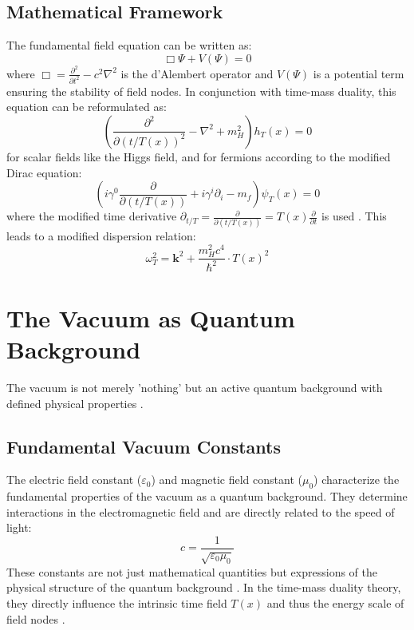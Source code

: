 \documentclass[12pt,a4paper]{article}
\begin{document}
	\subsection{Mathematical Framework}
	The fundamental field equation can be written as:
	\begin{equation}
		\Box \Psi + V(\Psi) = 0
	\end{equation}
	where \(\Box = \frac{\partial^2}{\partial t^2} - c^2 \nabla^2\) is the d'Alembert operator and \(V(\Psi)\) is a potential term ensuring the stability of field nodes. In conjunction with time-mass duality, this equation can be reformulated as:
	\begin{equation}
		\left(\frac{\partial^2}{\partial(t/T(x))^2} - \nabla^2 + m_H^2\right) h_T(x) = 0
	\end{equation}
	for scalar fields like the Higgs field, and for fermions according to the modified Dirac equation:
	\begin{equation}
		\left(i\gamma^0\frac{\partial}{\partial(t/T(x))} + i\gamma^i\partial_i - m_f\right) \psi_T(x) = 0
	\end{equation}
	where the modified time derivative \(\partial_{t/T} = \frac{\partial}{\partial(t/T(x))} = T(x)\frac{\partial}{\partial t}\) is used \cite{Pascher2024}\relax. This leads to a modified dispersion relation:
	\begin{equation}
		\omega_T^2 = \mathbf{k}^2 + \frac{m_H^2 c^4}{\hbar^2} \cdot T(x)^2
	\end{equation}
	
	\section{The Vacuum as Quantum Background}
	The vacuum is not merely 'nothing' but an active quantum background with defined physical properties \cite{Milonni1994}\relax.
	
	\subsection{Fundamental Vacuum Constants}
	The electric field constant (\(\varepsilon_0\)) and magnetic field constant (\(\mu_0\)) characterize the fundamental properties of the vacuum as a quantum background. They determine interactions in the electromagnetic field and are directly related to the speed of light:
	\begin{equation}
		c = \frac{1}{\sqrt{\varepsilon_0 \mu_0}}
	\end{equation}
	These constants are not just mathematical quantities but expressions of the physical structure of the quantum background \cite{Aitchison2004}\relax. In the time-mass duality theory, they directly influence the intrinsic time field \(T(x)\) and thus the energy scale of field nodes \cite{Pascher2024}\relax.
	
\end{document}
